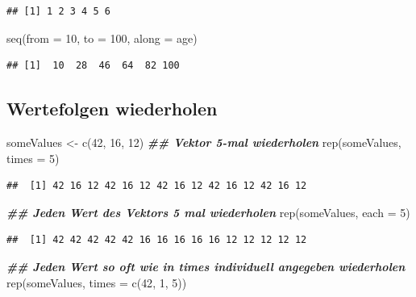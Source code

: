 \documentclass[
]{book}
\newenvironment{Shaded}{\begin{snugshade}}{\end{snugshade}}
\newcommand{\AttributeTok}[1]{\textcolor[rgb]{0.77,0.63,0.00}{#1}}
\newcommand{\DecValTok}[1]{\textcolor[rgb]{0.00,0.00,0.81}{#1}}
\newcommand{\DocumentationTok}[1]{\textcolor[rgb]{0.56,0.35,0.01}{\textbf{\textit{#1}}}}
\newcommand{\FunctionTok}[1]{\textcolor[rgb]{0.00,0.00,0.00}{#1}}
\newcommand{\NormalTok}[1]{#1}
\newcommand{\OtherTok}[1]{\textcolor[rgb]{0.56,0.35,0.01}{#1}}
\begin{document}
\begin{verbatim}
## [1] 1 2 3 4 5 6
\end{verbatim}

\begin{Shaded}
\begin{Highlighting}[]
\FunctionTok{seq}\NormalTok{(}\AttributeTok{from =} \DecValTok{10}\NormalTok{, }\AttributeTok{to =} \DecValTok{100}\NormalTok{, }\AttributeTok{along =}\NormalTok{ age)}
\end{Highlighting}
\end{Shaded}

\begin{verbatim}
## [1]  10  28  46  64  82 100
\end{verbatim}

\hypertarget{wertefolgen-wiederholen}{%
\subsection{Wertefolgen wiederholen}\label{wertefolgen-wiederholen}}

\scriptsize

\begin{Shaded}
\begin{Highlighting}[]
\NormalTok{someValues }\OtherTok{\textless{}{-}} \FunctionTok{c}\NormalTok{(}\DecValTok{42}\NormalTok{, }\DecValTok{16}\NormalTok{, }\DecValTok{12}\NormalTok{)}
 \DocumentationTok{\#\# Vektor 5{-}mal wiederholen}
\FunctionTok{rep}\NormalTok{(someValues, }\AttributeTok{times =} \DecValTok{5}\NormalTok{)}
\end{Highlighting}
\end{Shaded}

\begin{verbatim}
##  [1] 42 16 12 42 16 12 42 16 12 42 16 12 42 16 12
\end{verbatim}

\begin{Shaded}
\begin{Highlighting}[]
 \DocumentationTok{\#\# Jeden Wert des Vektors 5 mal wiederholen}
\FunctionTok{rep}\NormalTok{(someValues, }\AttributeTok{each =} \DecValTok{5}\NormalTok{)}
\end{Highlighting}
\end{Shaded}

\begin{verbatim}
##  [1] 42 42 42 42 42 16 16 16 16 16 12 12 12 12 12
\end{verbatim}

\begin{Shaded}
\begin{Highlighting}[]
 \DocumentationTok{\#\# Jeden Wert so oft wie in times individuell angegeben wiederholen}
\FunctionTok{rep}\NormalTok{(someValues, }\AttributeTok{times =} \FunctionTok{c}\NormalTok{(}\DecValTok{42}\NormalTok{, }\DecValTok{1}\NormalTok{, }\DecValTok{5}\NormalTok{))}
\end{Highlighting}
\end{Shaded}
\end{document}
